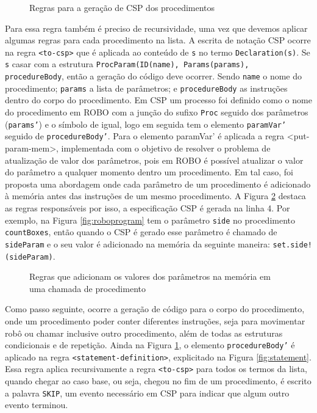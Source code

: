 \begin{figure}[h]
\centering
\caption{Regras para a geração de CSP dos procedimentos}

\label{fig:rules_proc}
\end{figure}

Para essa regra também é preciso de recursividade, uma vez que devemos aplicar algumas regras para cada procedimento na lista. A escrita de notação CSP ocorre na regra \texttt{<to-csp>} que é aplicada ao conteúdo de \texttt{s} no termo \texttt{Declaration(s)}. Se \texttt{s} casar com a estrutura \texttt{ProcParam(ID(name), Params(params), procedureBody}, então a geração do código deve ocorrer. Sendo \texttt{name} o nome do procedimento; \texttt{params} a lista de parâmetros; e \texttt{procedureBody} as instruções dentro do corpo do procedimento. Em CSP um processo foi definido como o nome do procedimento em ROBO com a junção do sufixo \texttt{Proc} seguido dos parâmetros (\texttt{params'}) e o símbolo de igual, logo em seguida tem o elemento \texttt{paramVar'} seguido de \texttt{procedureBody'}. Para o elemento paramVar' é aplicada a regra <put-param-mem>, implementada com o objetivo de resolver o problema de atualização de valor dos parâmetros, pois em ROBO é possível atualizar o valor do parâmetro a qualquer momento dentro um procedimento. Em tal caso, foi proposta uma abordagem onde cada parâmetro de um procedimento é adicionado à memória antes das instruções de um mesmo procedimento. A Figura \ref{fig:put_proc} destaca as regras responsáveis por isso, a especificação CSP é gerada na linha 4. Por exemplo, na Figura \ref{fig:roboprogram} tem o parâmetro \texttt{side} no procedimento \texttt{countBoxes}, então quando o CSP é gerado esse parâmetro é chamado de \texttt{sideParam} e o seu valor é adicionado na memória da seguinte maneira: \texttt{set.side!(sideParam)}.

\begin{figure}[h]
\centering
\caption{Regras que adicionam os valores dos parâmetros na memória em uma chamada de procedimento}

\label{fig:put_proc}
\end{figure}

Como passo seguinte, ocorre a geração de código para o corpo do procedimento, onde um procedimento poder conter diferentes instruções, seja para movimentar robô ou chamar inclusive outro procedimento, além de todas as estruturas condicionais e de repetição. Ainda na Figura \ref{fig:rules_proc}, o elemento \texttt{procedureBody'} é aplicado na regra \texttt{<statement-definition>}, explicitado na Figura \ref{fig:statement}. Essa regra aplica recursivamente a regra \texttt{<to-csp>} para todos os termos da lista, quando chegar ao caso base, ou seja, chegou no fim de um procedimento, é escrito a palavra \texttt{SKIP}, um evento necessário em CSP para indicar que algum outro evento terminou.

